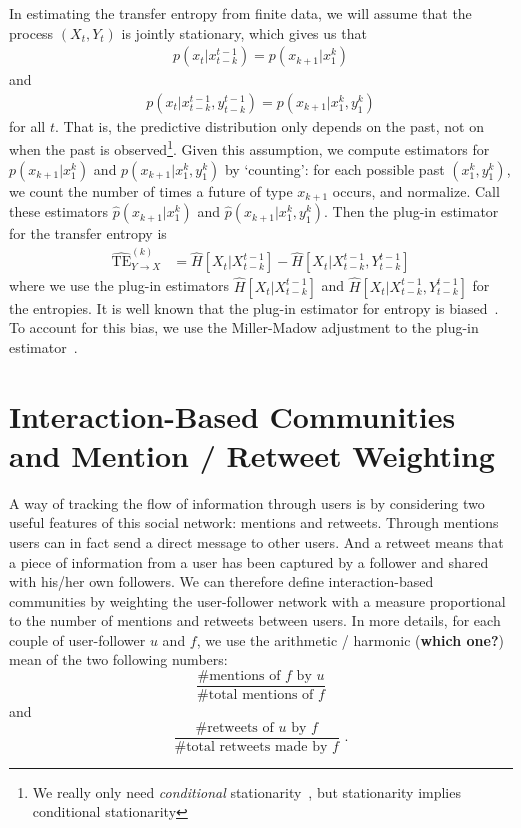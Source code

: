 In estimating the transfer entropy from finite data, we will assume that the process $(X_{t}, Y_{t})$ is jointly stationary, which gives us that
\begin{align}
	p(x_{t} | x_{t-k}^{t-1}) = p(x_{k+1} | x_{1}^{k})
\end{align}
and
\begin{align}
	p(x_{t} | x_{t-k}^{t-1}, y_{t-k}^{t-1}) = p(x_{k+1} | x_{1}^{k}, y_{1}^{k})
\end{align}
for all $t$. That is, the predictive distribution only depends on the past, not on when the past is observed\footnote{We really only need \emph{conditional} stationarity~\cite{caires2003nonparametric}, but stationarity implies conditional stationarity}. Given this assumption, we compute estimators for $p(x_{k+1} | x_{1}^{k})$ and $p(x_{k+1} | x_{1}^{k}, y_{1}^{k})$ by `counting': for each possible past $(x_{1}^{k}, y_{1}^{k})$, we count the number of times a future of type $x_{k+1}$ occurs, and normalize. Call these estimators $\hat{p}(x_{k+1} | x_{1}^{k})$ and $\hat{p}(x_{k+1} | x_{1}^{k}, y_{1}^{k})$. Then the plug-in estimator for the transfer entropy is
\begin{align}
	\widehat{\text{TE}}_{Y \to X}^{(k)} &= \hat{H}\left[X_{t} | X_{t-k}^{t-1}\right] - \hat{H}\left[X_{t} | X_{t-k}^{t-1}, Y_{t-k}^{t-1}\right]
\end{align}
where we use the plug-in estimators $\hat{H}\left[X_{t} | X_{t-k}^{t-1}\right]$ and $\hat{H}\left[X_{t} | X_{t-k}^{t-1}, Y_{t-k}^{t-1}\right]$ for the entropies. It is well known that the plug-in estimator for entropy is biased~\cite{paninski2003estimation}. To account for this bias, we use the Miller-Madow adjustment to the plug-in estimator~\cite{miller1955note}.

\section{Interaction-Based Communities and Mention / Retweet Weighting}
A way of tracking the flow of information through users is by considering two useful features of this social network: mentions and retweets. Through mentions users can in fact send a direct message to other users. And a retweet means that a piece of information from a user has been captured by a follower and shared with his/her own followers. We can therefore define interaction-based communities by weighting the user-follower network with a measure proportional to the number of mentions and retweets between users. In more details, for each couple of user-follower $u$ and $f$, we use the arithmetic / harmonic (\textbf{which one?}) mean of the two following numbers:
\begin{equation}
\frac{\mbox{\# mentions of }f \mbox{ by }u}{\mbox{\# total mentions of }f}
\end{equation}
and
\begin{equation}
\frac{\mbox{\# retweets of }u \mbox{ by }f}{\mbox{\# total retweets made by }f} \mbox{ .}
\end{equation}

